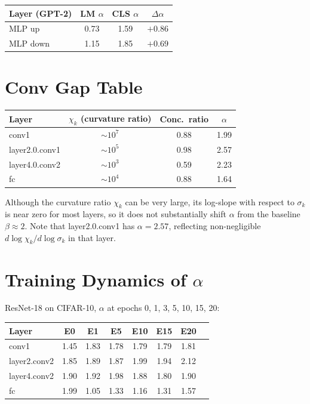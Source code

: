 \documentclass{article}
\begin{document}
\begin{center}
\small
\begin{tabular}{lccc}
\toprule
\textbf{Layer (GPT-2)} & LM $\alpha$ & CLS $\alpha$ & $\Delta\alpha$ \\
\midrule
MLP up & 0.73 & 1.59 & $+0.86$ \\
MLP down & 1.15 & 1.85 & $+0.69$ \\
\bottomrule
\end{tabular}
\end{center}

\section{Conv Gap Table}\label{app:conv-gap}

\begin{center}
\small
\begin{tabular}{lccc}
\toprule
\textbf{Layer} & $\chi_k$ (curvature ratio) & Conc.\ ratio & $\alpha$ \\
\midrule
conv1 & $\sim 10^7$ & 0.88 & 1.99 \\
layer2.0.conv1 & $\sim 10^5$ & 0.98 & 2.57 \\
layer4.0.conv2 & $\sim 10^3$ & 0.59 & 2.23 \\
fc & $\sim 10^4$ & 0.88 & 1.64 \\
\bottomrule
\end{tabular}
\end{center}

\noindent Although the curvature ratio $\chi_k$ can be very large, its log-slope with respect to $\sigma_k$ is near zero for most layers, so it does not substantially shift $\alpha$ from the baseline $\beta \approx 2$. Note that layer2.0.conv1 has $\alpha = 2.57$, reflecting non-negligible $d\log\chi_k/d\log\sigma_k$ in that layer.

\section{Training Dynamics of $\alpha$}\label{app:training-dynamics}

ResNet-18 on CIFAR-10, $\alpha$ at epochs 0, 1, 3, 5, 10, 15, 20:

\begin{center}
\small
\begin{tabular}{lccccccc}
\toprule
Layer & E0 & E1 & E5 & E10 & E15 & E20 \\
\midrule
conv1 & 1.45 & 1.83 & 1.78 & 1.79 & 1.79 & 1.81 \\
layer2.conv2 & 1.85 & 1.89 & 1.87 & 1.99 & 1.94 & 2.12 \\
layer4.conv2 & 1.90 & 1.92 & 1.98 & 1.88 & 1.80 & 1.90 \\
fc & 1.99 & 1.05 & 1.33 & 1.16 & 1.31 & 1.57 \\
\bottomrule
\end{tabular}
\end{center}
\end{document}
